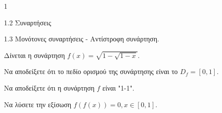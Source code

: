 \begin{ylh}{1}
    \item 1.2 Συναρτήσεις
    \item 1.3 Μονότονες συναρτήσεις - Αντίστροφη συνάρτηση.
\end{ylh}
Δίνεται η συνάρτηση $f(x) = \sqrt{1 - \sqrt{1 - x}}$.
\begin{alist}
\item Να αποδείξετε ότι το πεδίο ορισμού της συνάρτησης είναι το $D_f = [0,1]$. 
\item
    \begin{rlist}
    \item Να αποδείξετε ότι η συνάρτηση $f$ είναι "1-1". 
    \item Να λύσετε την εξίσωση $f(f(x)) = 0, x \in [0,1]$. 
    \end{rlist}
\end{alist}